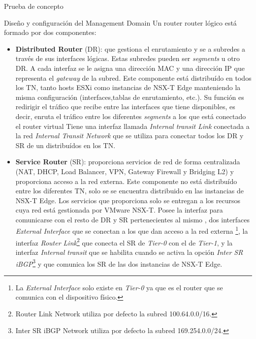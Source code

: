 \begin{section}{Prueba de concepto}
\begin{subsection}{Diseño y configuración del Management Domain}
    Un router router lógico está formado por dos componentes:
    \begin{itemize}
      
      \item \textbf{Distributed Router} (DR): que gestiona el enrutamiento y se a subredes a través de sus interfaces lógicas. Estas subredes pueden ser \textit{segments} u otro DR. A cada interfaz se le asigna una dirección MAC y una dirección IP que representa el \textit{gateway} de la subred. Este componente está distribuído en todos los TN, tanto hosts ESXi como instancias de NSX-T Edge manteniendo la misma configuración (interfaces,tablas de enrutamiento, etc.). Su función es redirigir el tráfico que recibe entre las interfaces que tiene disponibles, es decir, enruta el tráfico entre los diferentes \textit{segments} a los que está conectado el router virtual Tiene una interfaz llamada \textit{Internal transit Link} conectada a la red \textit{Internal Transit Network} que se utiliza para conectar todos los DR y SR de un  distribuídos en los TN.
      
      \item \textbf{Service Router} (SR): proporciona servicios de red de forma centralizada (NAT, DHCP, Load Balancer, VPN, Gateway Firewall y Bridging L2) y proporciona acceso a la red externa. Este componente no está distribuído entre los diferentes TN, solo se se encuentra distribuido en las instancias de NSX-T Edge. Los servicios que proporciona solo se entregan a los recursos cuya red está gestionada por VMware NSX-T. Posee la interfaz  para comunicarse con el resto de DR y SR pertenecientes al mismo , dos interfaces \textit{External Interface} que se conectan a los  que dan acceso a la red externa \footnote{La \textit{External Interface} solo existe en \textit{Tier-0} ya que es el router que se comunica con el dispositivo físico.}, la interfaz \textit{Router Link}\footnote{Router Link Network utiliza por defecto la subred 100.64.0.0/16.} que conecta el SR de \textit{Tier-0} con el de \textit{Tier-1}, y la interfaz \textit{Internal transit} que se habilita cuando se activa la opción \textit{Inter SR iBGP}\footnote{Inter SR iBGP Network utiliza por defecto la subred 169.254.0.0/24.} y que comunica los SR de las dos instancias de NSX-T Edge.
    \end{itemize}


\end{subsection}
\end{section}
